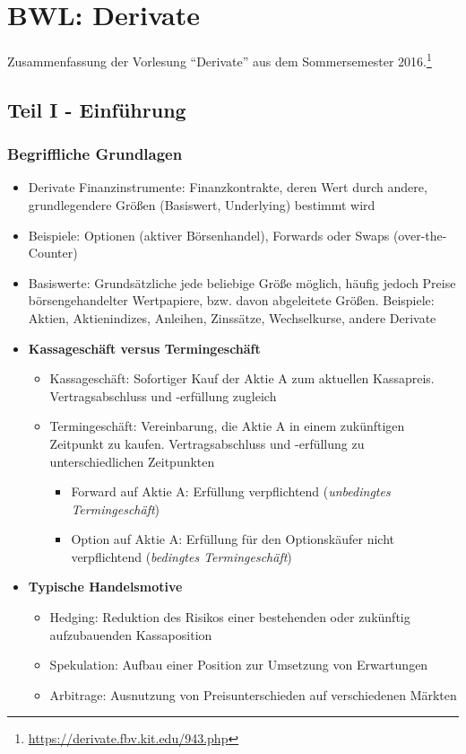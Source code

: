 \chapter{BWL: Derivate}

Zusammenfassung der Vorlesung "`Derivate"' aus dem Sommersemester 2016.\footnote{\url{https://derivate.fbv.kit.edu/943.php}}

\section{Teil I - Einführung}

\subsection{Begriffliche Grundlagen}
\begin{itemize}
	\item Derivate Finanzinstrumente: Finanzkontrakte, deren Wert durch andere, grundlegendere Größen (Basiswert, Underlying) bestimmt wird
	\item Beispiele: Optionen (aktiver Börsenhandel), Forwards oder Swaps (over-the-Counter)
	\item Basiswerte: Grundsätzliche jede beliebige Größe möglich, häufig jedoch Preise börsengehandelter Wertpapiere, bzw. davon abgeleitete Größen. Beispiele: Aktien, Aktienindizes, Anleihen, Zinssätze, Wechselkurse, andere Derivate
	\item \textbf{Kassageschäft versus Termingeschäft}
	\begin{itemize}
		\item Kassageschäft: Sofortiger Kauf der Aktie A zum aktuellen Kassapreis. Vertragsabschluss und -erfüllung zugleich
		\item Termingeschäft: Vereinbarung, die Aktie A in einem zukünftigen Zeitpunkt zu kaufen. Vertragsabschluss und -erfüllung zu unterschiedlichen Zeitpunkten
		\begin{itemize}
			\item Forward auf Aktie A: Erfüllung verpflichtend (\textit{unbedingtes Termingeschäft})
			\item Option auf Aktie A: Erfüllung für den Optionskäufer nicht verpflichtend (\textit{bedingtes Termingeschäft})
		\end{itemize}
	\end{itemize}
	\item \textbf{Typische Handelsmotive}
	\begin{itemize}
		\item Hedging: Reduktion des Risikos einer bestehenden oder zukünftig aufzubauenden Kassaposition
		\item Spekulation: Aufbau einer Position zur Umsetzung von Erwartungen
		\item Arbitrage: Ausnutzung von Preisunterschieden auf verschiedenen Märkten
	\end{itemize}
\end{itemize}

